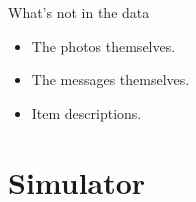 \documentclass[aspectratio=169]{beamer}
\begin{document}
\begin{frame}{What's not in the data}
	\begin{itemize}
		\item The photos themselves.
		\item The messages themselves.
		\item Item descriptions.
	\end{itemize}
\end{frame}

\begin{frame}
	\begin{figure}
		\centering
		\texttt{[image: \\detokenize\{w2v/w2v\_meta.png]}}
	\end{figure}
\end{frame}


\section{Simulator}\label{sec:simulator}
\end{document}
